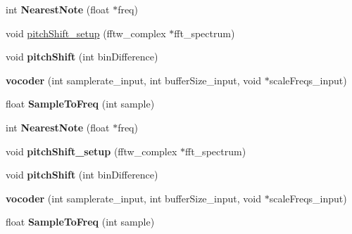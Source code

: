 \begin{DoxyCompactItemize}
\item 
\hypertarget{classvocoder_a8b1e51e28458338abc0eeaac00c1842f}{int {\bfseries Nearest\-Note} (float $\ast$freq)}\label{classvocoder_a8b1e51e28458338abc0eeaac00c1842f}

\item 
void \hyperlink{classvocoder_aa3d122aee6d6ae77ac5b04572e924dc0}{pitch\-Shift\-\_\-setup} (fftw\-\_\-complex $\ast$fft\-\_\-spectrum)
\item 
\hypertarget{classvocoder_a07c540451934cd255a52d16e149373cc}{void {\bfseries pitch\-Shift} (int bin\-Difference)}\label{classvocoder_a07c540451934cd255a52d16e149373cc}

\item 
\hypertarget{classvocoder_a759189527108a2f32b992406b8210db8}{{\bfseries vocoder} (int samplerate\-\_\-input, int buffer\-Size\-\_\-input, void $\ast$scale\-Freqs\-\_\-input)}\label{classvocoder_a759189527108a2f32b992406b8210db8}

\item 
\hypertarget{classvocoder_a2b3a6e386d3a18f9366320e5743d33b1}{float {\bfseries Sample\-To\-Freq} (int sample)}\label{classvocoder_a2b3a6e386d3a18f9366320e5743d33b1}

\item 
\hypertarget{classvocoder_a8b1e51e28458338abc0eeaac00c1842f}{int {\bfseries Nearest\-Note} (float $\ast$freq)}\label{classvocoder_a8b1e51e28458338abc0eeaac00c1842f}

\item 
\hypertarget{classvocoder_aa3d122aee6d6ae77ac5b04572e924dc0}{void {\bfseries pitch\-Shift\-\_\-setup} (fftw\-\_\-complex $\ast$fft\-\_\-spectrum)}\label{classvocoder_aa3d122aee6d6ae77ac5b04572e924dc0}

\item 
\hypertarget{classvocoder_a07c540451934cd255a52d16e149373cc}{void {\bfseries pitch\-Shift} (int bin\-Difference)}\label{classvocoder_a07c540451934cd255a52d16e149373cc}

\item 
\hypertarget{classvocoder_a759189527108a2f32b992406b8210db8}{{\bfseries vocoder} (int samplerate\-\_\-input, int buffer\-Size\-\_\-input, void $\ast$scale\-Freqs\-\_\-input)}\label{classvocoder_a759189527108a2f32b992406b8210db8}

\item 
\hypertarget{classvocoder_a2b3a6e386d3a18f9366320e5743d33b1}{float {\bfseries Sample\-To\-Freq} (int sample)}\label{classvocoder_a2b3a6e386d3a18f9366320e5743d33b1}


\end{DoxyCompactItemize}
